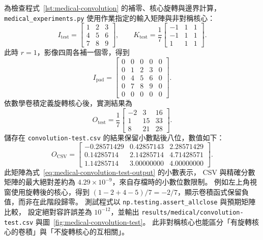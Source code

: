 為檢查程式~\ref{lst:medical-convolution} 的補零、核心旋轉與邊界計算，
\texttt{medical\_experiments.py} 使用作業指定的輸入矩陣與非對稱核心：
\begin{equation}
  I_{\mathrm{test}}=
  \begin{bmatrix}1&2&3\\4&5&6\\7&8&9\end{bmatrix},
  \qquad
  K_{\mathrm{test}}=\frac{1}{7}
  \begin{bmatrix}-1&1&1\\-1&1&1\\1&1&1\end{bmatrix}.
\end{equation}
此時 $r=1$，影像四周各補一個零，得到
\begin{equation}
  I_{\mathrm{pad}}=
  \begin{bmatrix}
    0&0&0&0&0\\
    0&1&2&3&0\\
    0&4&5&6&0\\
    0&7&8&9&0\\
    0&0&0&0&0
  \end{bmatrix}.
\end{equation}
依數學卷積定義旋轉核心後，實測結果為
\begin{equation}
  O_{\mathrm{test}}=\frac{1}{7}
  \begin{bmatrix}-2&3&16\\1&15&33\\8&21&28\end{bmatrix}.
  \label{eq:medical-convolution-test-output}
\end{equation}
儲存在 \texttt{convolution-test.csv} 的結果保留小數點後八位，數值如下：
\begin{equation}
  O_{\mathrm{CSV}}=
  \begin{bmatrix}
    -0.28571429&0.42857143&2.28571429\\
     0.14285714&2.14285714&4.71428571\\
     1.14285714&3.00000000&4.00000000
  \end{bmatrix}.
  \label{eq:medical-convolution-csv}
\end{equation}
此矩陣為式~\ref{eq:medical-convolution-test-output} 的小數表示，
CSV 與精確分數矩陣的最大絕對差約為 $4.29\times10^{-9}$，來自存檔時的小數位數限制。
例如左上角視窗使用旋轉後的核心，得到
$(1-2+4-5)/7=-2/7$，顯示卷積函式保留負值，而非在此階段歸零。
測試程式以 \texttt{np.testing.assert\_allclose} 與預期矩陣比較，
設定絕對容許誤差為 $10^{-12}$，並輸出
\texttt{results/medical/convolution-test.csv} 與圖~\ref{fig:medical-convolution-test}。
此非對稱核心也能區分「有旋轉核心的卷積」與「不旋轉核心的互相關」。

